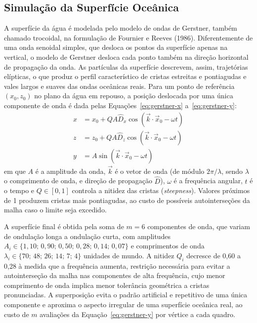 \documentclass[conference]{IEEEtran}
\begin{document}
\subsection{Simulação da Superfície Oceânica}
\label{sub:agua}

A superfície da água é modelada pelo modelo de ondas de Gerstner, também
chamado trocoidal, na formulação de Fournier e Reeves (1986). Diferentemente
de uma onda senoidal simples, que desloca os pontos da superfície apenas na
vertical, o modelo de Gerstner desloca cada ponto também na direção
horizontal de propagação da onda. As partículas da superfície descrevem,
assim, trajetórias elípticas, o que produz o perfil característico de
cristas estreitas e pontiagudas e vales largos e suaves das ondas oceânicas
reais. Para um ponto de referência $(x_0, z_0)$ no plano da água em repouso,
a posição deslocada por uma única componente de onda é dada pelas
Equações~\eqref{eq:gerstner-x} a~\eqref{eq:gerstner-y}:
\begin{align}
x &= x_0 + Q A \hat{D}_x \cos(\vec{k} \cdot \vec{x}_0 - \omega t) \label{eq:gerstner-x}\\
z &= z_0 + Q A \hat{D}_z \cos(\vec{k} \cdot \vec{x}_0 - \omega t) \label{eq:gerstner-z}\\
y &= A \sin(\vec{k} \cdot \vec{x}_0 - \omega t) \label{eq:gerstner-y}
\end{align}
em que $A$ é a amplitude da onda, $\vec{k}$ é o vetor de onda (de módulo
$2\pi/\lambda$, sendo $\lambda$ o comprimento de onda, e direção de
propagação $\hat{D}$), $\omega$ é a frequência angular, $t$ é o tempo e
$Q \in [0,1]$ controla a nitidez das cristas (\emph{steepness}). Valores
próximos de 1 produzem cristas mais pontiagudas, ao custo de possíveis
autointerseções da malha caso o limite seja excedido.

A superfície final é obtida pela soma de $m = 6$ componentes de onda, que
variam de ondulação longa a ondulação curta, com amplitudes
$A_i \in \{1{,}10;\, 0{,}90;\, 0{,}50;\, 0{,}28;\, 0{,}14;\, 0{,}07\}$ e
comprimentos de onda $\lambda_i \in \{70;\, 48;\, 26;\, 14;\, 7;\, 4\}$
unidades de mundo. A nitidez $Q_i$ decresce de 0,60 a 0,28 à medida que a
frequência aumenta, restrição necessária para evitar a autointerseção da
malha nas componentes de alta frequência, cujo menor comprimento de onda
implica menor tolerância geométrica a cristas pronunciadas. A superposição
evita o padrão artificial e repetitivo de uma única componente e aproxima o
aspecto irregular de uma superfície oceânica real, ao custo de $m$
avaliações da Equação~\eqref{eq:gerstner-y} por vértice a cada quadro.
\end{document}
